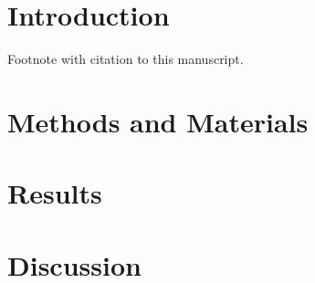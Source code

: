 
\section{Introduction}
Footnote with citation to this manuscript.

\section{Methods and Materials}

\section{Results}

\section{Discussion}

